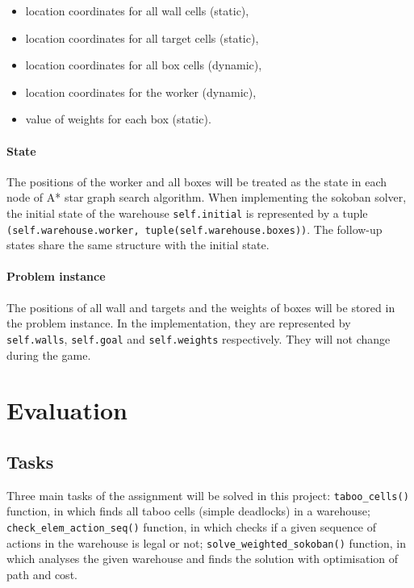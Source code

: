 \documentclass{article}
\begin{document}
\begin{itemize}
    \item location coordinates for all wall cells (static),
    \item location coordinates for all target cells (static),
    \item location coordinates for all box cells (dynamic),
    \item location coordinates for the worker (dynamic),
    \item value of weights for each box (static).
\end{itemize}

\paragraph{State}

The positions of the worker and all boxes will be treated as the state in each node of A* star graph search algorithm. When implementing the sokoban solver, the initial state of the warehouse \texttt{self.initial} is represented by a tuple \texttt{(self.warehouse.worker, tuple(self.warehouse.boxes))}. The follow-up states share the same structure with the initial state.

\paragraph{Problem instance}

The positions of all wall and targets and the weights of boxes will be stored in the problem instance. In the implementation, they are represented by \texttt{self.walls}, \texttt{self.goal} and \texttt{self.weights} respectively. They will not change during the game.

\section{Evaluation}

\subsection{Tasks}

Three main tasks of the assignment will be solved in this project: \texttt{taboo\_cells()} function, in which finds all taboo cells (simple deadlocks) in a warehouse; \texttt{check\_elem\_action\_seq()} function, in which checks if a given sequence of actions in the warehouse is legal or not; \texttt{solve\_weighted\_sokoban()} function, in which analyses the given warehouse and finds the solution with optimisation of path and cost. 
\end{document}
